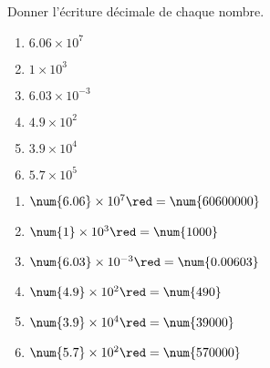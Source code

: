 \begin{exercice*}    
    Donner l'écriture décimale de chaque nombre.
    \begin{multicols}{2}
        \begin{enumerate}
            \item $\num{6.06}\times 10^{7}$
            \item $\num{1}   \times 10^{3}$
            \item $\num{6.03}\times 10^{-3}$
            \item $\num{4.9} \times 10^{2}$
            \item $\num{3.9} \times 10^{4}$
            \item $\num{5.7} \times 10^{5}$
        \end{enumerate}
    \end{multicols}
    
\end{exercice*}
\begin{corrige}
    \begin{enumerate}
        \item $\num{6.06}\times 10^{7} {\red = \num{60600000}}$
        \item $\num{1}   \times 10^{3} {\red = \num{1000}}$
        \item $\num{6.03}\times 10^{-3}{\red = \num{0.00603}}$
        \item $\num{4.9} \times 10^{2} {\red = \num{490}}$
        \item $\num{3.9} \times 10^{4} {\red = \num{39000}}$
        \item $\num{5.7} \times 10^{2} {\red = \num{570000}}$
    \end{enumerate}
\end{corrige}

